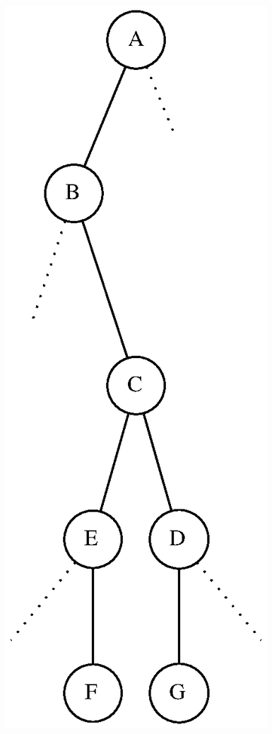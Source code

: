 \documentclass[aspectratio=169]{beamer}
\begin{document}
\begin{frame}
\begin{columns}[T]
\begin{column}{0.25\linewidth}
\begin{figure}[h]
	\includegraphics[height=0.7\paperheight]{imagens/arvore_b-v3.eps}
\end{figure}
\end{column}
\end{columns}
\end{frame}
\end{document}

